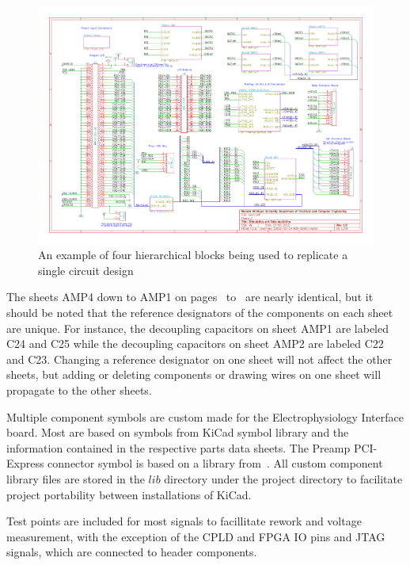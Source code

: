 \begin{figure}[h]
	\begin{singlespace}
	\centering
	\includegraphics[page=1,trim=6.5in 5.6in 0.5in 0.6in,clip]{./figures/SchematicRev1r0} %
	\caption{An example of four hierarchical blocks being used to replicate a single circuit design \label{fig:hblockx4}}
	\end{singlespace}
\end{figure}

The sheets AMP4 down to AMP1 on pages~\pageref{SchematicRev1r0.15} to~\pageref{SchematicRev1r0.18} are nearly identical, but it should be noted that the reference designators of the components on each sheet are unique.  For instance, the decoupling capacitors on sheet AMP1 are labeled C24 and C25 while the decoupling capacitors on sheet AMP2 are labeled C22 and C23.  Changing a reference designator on one sheet will not affect the other sheets, but adding or deleting components or drawing wires on one sheet will propagate to the other sheets.

Multiple component symbols are custom made for the Electrophysiology Interface board.  Most are based on symbols from KiCad symbol library and the information contained in the respective parts data sheets.  The Preamp PCI-Express connector symbol is based on a library from~\cite{osheclib}.  All custom component library files are stored in the $lib$ directory under the project directory to facilitate project portability between installations of KiCad.

Test points are included for most signals to facillitate rework and voltage measurement, with the exception of the CPLD and FPGA IO pins and JTAG signals, which are connected to header components.

